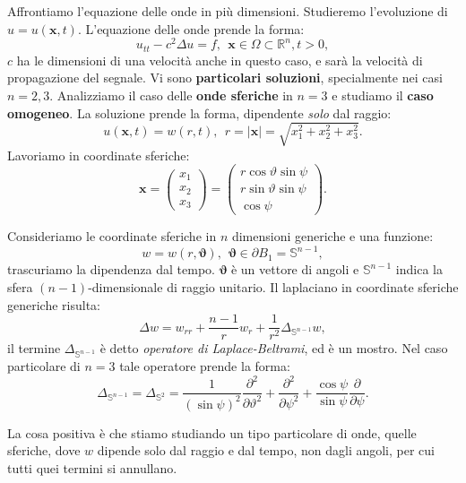 \documentclass[10pt,a4paper,twoside,openright]{book}
\newcommand{\x}{\mathbf{x}}
\begin{document}
Affrontiamo l'equazione delle onde in più dimensioni. Studieremo l'evoluzione di $u=u(\x ,t)$. L'equazione delle onde prende la forma:
\begin{equation}
    u_{tt} -c^{2} \Delta u=f,\ \ \x \in \Omega \subset \mathbb{R}^{n} ,t >0,
\end{equation}
$c$ ha le dimensioni di una velocità anche in questo caso, e sarà la velocità di propagazione del segnale. Vi sono \textbf{particolari soluzioni}, specialmente nei casi $n=2,3$. Analizziamo il caso delle \textbf{onde sferiche} in $n=3$ e studiamo il \textbf{caso omogeneo}. La soluzione prende la forma, dipendente \textit{solo} dal raggio:
\begin{equation*}
    u(\x ,t) =w(r,t) ,\ \ r=| \x| =\sqrt{x_{1}^{2} +x_{2}^{2} +x_{3}^{2}} .
\end{equation*}
Lavoriamo in coordinate sferiche:
\begin{equation*}
    \x =
    \begin{pmatrix}
        x_{1} \\
        x_{2} \\
        x_{3}
    \end{pmatrix} =
    \begin{pmatrix}
        r\cos \vartheta \sin \psi \\
        r\sin \vartheta \sin \psi \\
        \cos \psi
    \end{pmatrix} .
\end{equation*}
\begin{nb}
    Consideriamo le coordinate sferiche in $n$ dimensioni generiche e una funzione:
    \begin{equation*}
        w=w(r,\bm{\vartheta }) ,\ \ \bm{\vartheta } \in \partial B_{1} =\mathbb{S}^{n-1} ,
    \end{equation*}
    trascuriamo la dipendenza dal tempo. $\bm{\vartheta }$ è un vettore di angoli e $\mathbb{S}^{n-1}$ indica la sfera $(n-1)$-dimensionale di raggio unitario. Il laplaciano in coordinate sferiche generiche risulta:
    \begin{equation}
        \Delta w=w_{rr} +\frac{n-1}{r} w_{r} +\frac{1}{r^{2}} \Delta _{\mathbb{S}^{n-1}} w,
    \end{equation}
    il termine $\Delta _{\mathbb{S}^{n-1}}$ è detto \textit{operatore di Laplace-Beltrami}, ed è un mostro. Nel caso particolare di $n=3$ tale operatore prende la forma:
    \begin{equation}
        \Delta _{\mathbb{S}^{n-1}} =\Delta _{\mathbb{S}^{2}} =\frac{1}{(\sin \psi)^{2}}\frac{\partial ^{2}}{\partial \vartheta ^{2}} +\frac{\partial ^{2}}{\partial \psi ^{2}} +\frac{\cos \psi }{\sin \psi }\frac{\partial }{\partial \psi } .
    \end{equation}
\end{nb}
La cosa positiva è che stiamo studiando un tipo particolare di onde, quelle sferiche, dove $w$ dipende solo dal raggio e dal tempo, non dagli angoli, per cui tutti quei termini si annullano.
\end{document}
